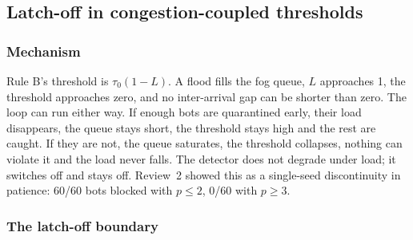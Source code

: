 \subsection{Latch-off in congestion-coupled thresholds}\label{sec:latch}
\subsubsection{Mechanism}
Rule B's threshold is $\tau_0(1-L)$. A flood fills the fog queue, $L$ approaches 1, the threshold approaches zero, and no inter-arrival gap can be shorter than zero. The loop can run either way. If enough bots are quarantined early, their load disappears, the queue stays short, the threshold stays high and the rest are caught. If they are not, the queue saturates, the threshold collapses, nothing can violate it and the load never falls. The detector does not degrade under load; it switches off and stays off. Review~2 showed this as a single-seed discontinuity in patience: 60/60 bots blocked with $p \le 2$, 0/60 with $p \ge 3$.

\subsubsection{The latch-off boundary}

